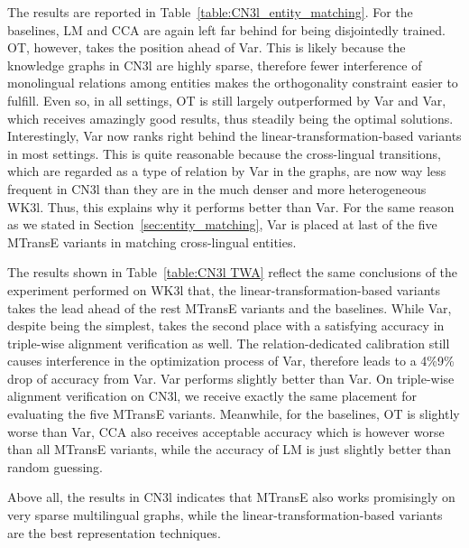 \documentclass{article}
\begin{document}
 The results are reported in Table~\ref{table:CN3l_entity_matching}. For the baselines, LM and CCA are again left far behind for being disjointedly trained. OT, however, takes the position ahead of Var. This is likely because the knowledge graphs in CN3l are highly sparse, therefore fewer interference of monolingual relations among entities makes the orthogonality constraint easier to fulfill. Even so, in all settings, OT is still largely outperformed by Var and Var, which receives amazingly good results, thus steadily being the optimal solutions. Interestingly, Var now ranks right behind the linear-transformation-based variants in most settings. This is quite reasonable because the cross-lingual transitions, which are regarded as a type of relation by Var in the graphs, are now way less frequent in CN3l than they are in the much denser and more heterogeneous WK3l. Thus, this explains why it performs better than Var. For the same reason as we stated in Section~\ref{sec:entity_matching}, Var is placed at last of the five MTransE variants in matching cross-lingual entities.

  The results shown in Table~\ref{table:CN3l TWA} reflect the same conclusions of the experiment performed on WK3l that, the linear-transformation-based variants takes the lead ahead of the rest MTransE variants and the baselines. While Var, despite being the simplest, takes the second place with a satisfying accuracy in triple-wise alignment verification as well. The relation-dedicated calibration still causes interference in the optimization process of Var, therefore leads to a 4\%9\% drop of accuracy from Var. Var performs slightly better than Var. On triple-wise alignment verification on CN3l, we receive exactly the same placement for evaluating the five MTransE variants. Meanwhile, for the baselines, OT is slightly worse than Var, CCA also receives acceptable accuracy which is however worse than all MTransE variants, while the accuracy of LM is just slightly better than random guessing.

\par
Above all, the results in CN3l indicates that MTransE also works promisingly on very sparse multilingual graphs, while the linear-transformation-based variants are the best representation techniques.
\end{document}
